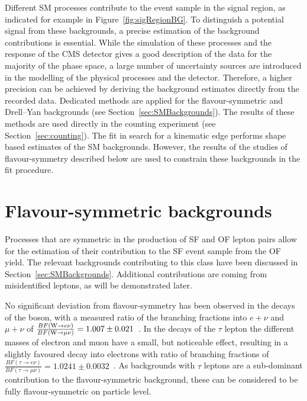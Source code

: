 \label{sec:backgrounds}
Different SM processes contribute to the event sample in the signal region, as indicated for example in Figure~\ref{fig:sigRegionBG}. To distinguish a potential signal from these backgrounds, a precise estimation of the background contributions is essential. While the simulation of these processes and the response of the CMS detector gives a good description of the data for the majority of the phase space, a large number of uncertainty sources are introduced in the modelling of the physical processes and the detector. Therefore, a higher precision can be achieved by deriving the background estimates directly from the recorded data. Dedicated methods are applied for the flavour-symmetric and Drell--Yan backgrounds (see Section~\ref{sec:SMBackgrounds}). The results of these methods are used directly in the counting experiment (see Section~\ref{sec:counting}). The fit in search for a kinematic edge performs shape based estimates of the SM backgrounds. However, the results of the studies of flavour-symmetry described below are used to constrain these backgrounds in the fit procedure.

\section{Flavour-symmetric backgrounds}
Processes that are symmetric in the production of SF and OF lepton pairs allow for the estimation of their contribution to the SF event sample from the OF yield. The relevant backgrounds contributing to this class have been discussed in Section~\ref{sec:SMBackgrounds}. Additional contributions are coming from misidentified leptons, as will be demonstrated later. 

No significant deviation from flavour-symmetry has been observed in the decays of the \W boson, with a measured ratio of the branching fractions into $e+\nu$ and $\mu + \nu$ of $\frac{BF(\mathrm{W}\rightarrow e\nu)}{BF(\mathrm{W}\rightarrow \mu\nu)} = 1.007\pm0.021$~\cite{PDG}. In the decays of the $\tau$ lepton the different masses of electron and muon have a small, but noticeable effect, resulting in a slightly favoured decay into electrons with ratio of branching fractions of  $\frac{BF(\tau\rightarrow e\nu)}{BF(\tau\rightarrow \mu\nu)} = 1.0241\pm0.0032$~\cite{PDG}. As backgrounds with $\tau$ leptons are a sub-dominant contribution to the flavour-symmetric background, these can be considered to be fully flavour-symmetric on particle level. 


